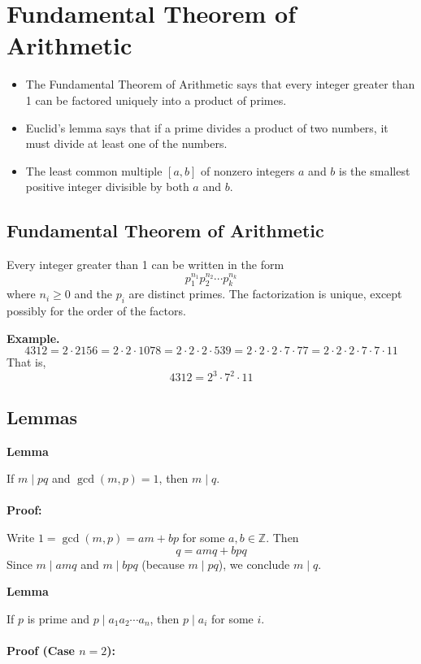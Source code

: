 \newpage
\section{Fundamental Theorem of Arithmetic}

\begin{itemize}[label=\(-\)]
	\item The Fundamental Theorem of Arithmetic says that every integer greater than 1 can be factored uniquely into a product of primes.
	\item Euclid’s lemma says that if a prime divides a product of two numbers, it must divide at least one of the numbers.
	\item The least common multiple \([a, b]\) of nonzero integers \(a\) and \(b\) is the smallest positive integer divisible by both \(a\) and \(b\).
\end{itemize}

\subsection{Fundamental Theorem of Arithmetic}

Every integer greater than 1 can be written in the form
\[
	p_1^{n_1}p_2^{n_2} \cdots p_k^{n_k}
\]
where \(n_i \geq 0\) and the \(p_i\) are distinct primes. The factorization is unique, except possibly for the order of the factors.

\textbf{Example.}
\[
	4312 = 2 \cdot 2156 = 2 \cdot 2 \cdot 1078 = 2 \cdot 2 \cdot 2 \cdot 539 = 2 \cdot 2 \cdot 2 \cdot 7 \cdot 77 = 2 \cdot 2 \cdot 2 \cdot 7 \cdot 7 \cdot 11
\]
That is,
\[
	4312 = 2^3 \cdot 7^2 \cdot 11
\]

\subsection{Lemmas}

\textbf{Lemma} 

If \(m \mid pq\) and \(\gcd(m, p) = 1\), then \(m \mid q\).
\\\\
\textbf{Proof:} 

Write \(1 = \gcd(m, p) = am + bp\) for some \(a, b \in \mathbb{Z}\).
Then
\[
	q = amq + bpq
\]
Since \(m \mid amq\) and \(m \mid bpq\) (because \(m \mid pq\)), we conclude \(m \mid q\).

\QED


\textbf{Lemma} 

If \(p\) is prime and \(p \mid a_1a_2 \cdots a_n\), then \(p \mid a_i\) for some \(i\).
\\\\
\textbf{Proof (Case \(n=2\)):} 

